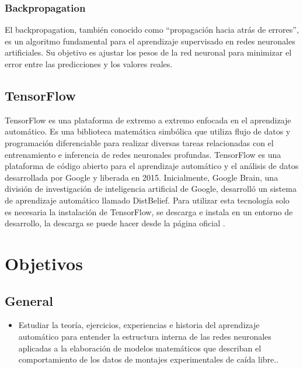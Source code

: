 \documentclass[titlepage,11pt]{article}
\begin{document}
	\subsubsection{Backpropagation}
		El backpropagation, también conocido como “propagación hacia atrás de errores”, es un algoritmo fundamental para el aprendizaje supervisado en redes neuronales artificiales. Su objetivo es ajustar los pesos de la red neuronal para minimizar el error entre las predicciones y los valores reales.
		

\subsection{TensorFlow}
\label{subsec:ts}
	TensorFlow es una plataforma de extremo a extremo enfocada en el aprendizaje automático. Es una biblioteca matemática simbólica que utiliza flujo de datos y programación diferenciable para realizar diversas tareas relacionadas con el entrenamiento e inferencia de redes neuronales profundas. TensorFlow es una plataforma de código abierto para el aprendizaje automático y el análisis de datos desarrollada por Google y liberada en 2015. Inicialmente, Google Brain, una división de investigación de inteligencia artificial de Google, desarrolló un sistema de aprendizaje automático llamado DistBelief. Para utilizar esta tecnología solo es necesaria la instalación de TensorFlow, se descarga e instala en un entorno de desarrollo, la descarga se puede hacer desde la p\'agina oficial \cite{TensorFlow}.  



\section{Objetivos}
\label{sec:objetivos}
	


\subsection{General}
\label{sec:general}

\begin{itemize}
	\item Estudiar la teoría, ejercicios, experiencias e historia del aprendizaje automático para entender la estructura interna de las redes neuronales aplicadas a la elaboración de modelos matemáticos que describan el comportamiento de los datos de montajes experimentales de caída libre.. 
\end{itemize}
\end{document}
